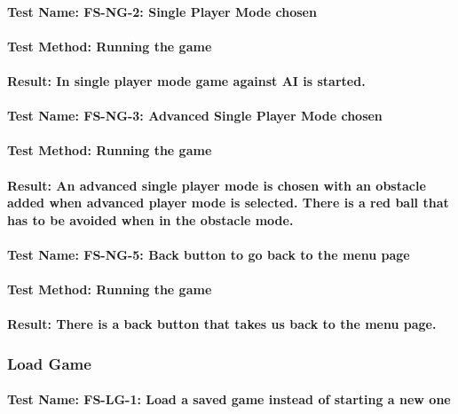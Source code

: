 \documentclass[12pt, titlepage]{article}
\begin{document}
\paragraph {Test Name: FS-NG-2: Single Player Mode chosen}
\paragraph {Test Method: Running the game}
\paragraph {Result: In single player mode game against AI is started.}

\paragraph {Test Name: FS-NG-3: Advanced Single Player Mode chosen}
\paragraph {Test Method: Running the game}
\paragraph {Result: An advanced single player mode is chosen with an obstacle added when advanced player mode is selected.  There is a red ball that has to be avoided when in the obstacle mode.}

\paragraph {Test Name: FS-NG-5: Back button to go back to the menu page}
\paragraph {Test Method: Running the game}
\paragraph {Result: There is a back button that takes us back to the menu page.}

\subsubsection {Load Game}
\paragraph {Test Name: FS-LG-1: Load a saved game instead of starting a new one}
\end{document}
